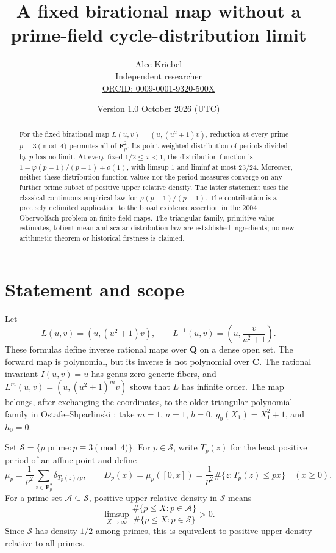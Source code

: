 \documentclass[11pt]{article}
\title{A fixed birational map without a\\prime-field cycle-distribution limit}
\author{Alec Kriebel\\[3pt]\small Independent researcher\\\small \href{https://orcid.org/0009-0001-9320-500X}{ORCID: 0009-0001-9320-500X}}
\date{Version 1.0 \quad 21 October 2026 (UTC)}
\theoremstyle{remark}
\newcommand{\Fp}{\mathbf F_p}
\newcommand{\Q}{\mathbf Q}
\newcommand{\C}{\mathbf C}
\begin{document}
\maketitle
\begin{abstract}
For the fixed birational map $L(u,v)=(u,(u^2+1)v)$, reduction at every
prime $p\equiv3\pmod4$ permutes all of $\Fp^2$. Its point-weighted
distribution of periods divided by $p$ has no limit. At every fixed
$1/2\le x<1$, the distribution function is
$1-\varphi(p-1)/(p-1)+o(1)$, with limsup $1$ and liminf at most $23/24$.
Moreover, neither these distribution-function values nor the period
measures converge on any further prime subset of positive upper relative
density. The latter statement uses the classical continuous empirical
law for $\varphi(p-1)/(p-1)$. The contribution is a precisely delimited
application to the broad existence assertion in the 2004 Oberwolfach
problem on finite-field maps. The triangular family, primitive-value
estimates, totient mean and scalar distribution law are established
ingredients; no new arithmetic theorem or historical firstness is claimed.
\end{abstract}

\section{Statement and scope}
Let
\begin{equation}\label{eq:map}
 L(u,v)=(u,(u^2+1)v),\qquad
 L^{-1}(u,v)=\left(u,\frac{v}{u^2+1}\right).
\end{equation}
These formulas define inverse rational maps over $\Q$ on a dense open
set. The forward map is polynomial, but its inverse is not polynomial
over $\C$. The rational invariant $I(u,v)=u$ has genus-zero generic
fibers, and $L^m(u,v)=(u,(u^2+1)^m v)$ shows that $L$ has infinite order.
The map belongs, after exchanging the coordinates, to the older
triangular polynomial family in Ostafe--Shparlinski
\cite[\S2.1, (1)--(4)]{OS}: take $m=1$, $a=1$, $b=0$,
$g_0(X_1)=X_1^2+1$, and $h_0=0$.

Set $\mathcal S=\{p\text{ prime}:p\equiv3\pmod4\}$. For $p\in\mathcal S$,
write $T_p(z)$ for the least positive period of an affine point and define
\begin{equation}\label{eq:measure}
 \mu_p=\frac1{p^2}\sum_{z\in\Fp^2}\delta_{T_p(z)/p},
 \qquad D_p(x)=\mu_p([0,x])
       =\frac1{p^2}\#\{z:T_p(z)\le px\}\quad(x\ge0).
\end{equation}
For a prime set $\mathcal A\subseteq\mathcal S$, positive upper relative
density in $\mathcal S$ means
\begin{equation}\label{eq:density}
 \limsup_{X\to\infty}
 \frac{\#\{p\le X:p\in\mathcal A\}}{\#\{p\le X:p\in\mathcal S\}}>0.
\end{equation}
Since $\mathcal S$ has density $1/2$ among primes, this is equivalent to
positive upper density relative to all primes.
\end{document}
